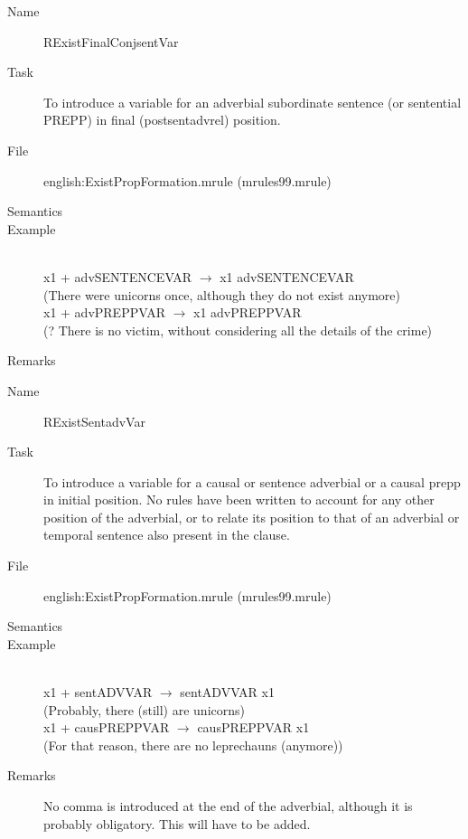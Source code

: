 \begin{description}
\vspace{1 cm}
\begin{description}
\item[Name] RExistFinalConjsentVar
\item[Task] To introduce a variable for an adverbial subordinate sentence (or 
sentential PREPP) in final (postsentadvrel) position.
\item[File] english:ExistPropFormation.mrule (mrules99.mrule)
\item[Semantics]
\item[Example] \mbox{}\\
x1 + advSENTENCEVAR $\rightarrow$ x1 advSENTENCEVAR \\
(There were unicorns once, although they do not exist anymore)\\
x1 + advPREPPVAR $\rightarrow$ x1 advPREPPVAR \\
(? There is no victim, without considering all the details of the crime)
\item[Remarks] 
\end{description}

\vspace{1 cm}
\begin{description}
\item[Name] RExistSentadvVar
\item[Task] To introduce a variable for a causal or sentence adverbial or a 
causal prepp in 
initial position. No rules have been written to account for any other position 
of the adverbial, or to relate its position to that of an adverbial or temporal 
sentence also present in the clause.
\item[File] english:ExistPropFormation.mrule (mrules99.mrule)
\item[Semantics]
\item[Example] \mbox{}\\
x1 + sentADVVAR $\rightarrow$ sentADVVAR x1 \\
(Probably, there (still) are unicorns)\\
x1 + causPREPPVAR $\rightarrow$ causPREPPVAR x1 \\
(For that reason, there are no leprechauns (anymore))
\item[Remarks] No comma is introduced at the end of the adverbial, 
although it is probably obligatory. This will have to be added.
\end{description}

\end{description}

